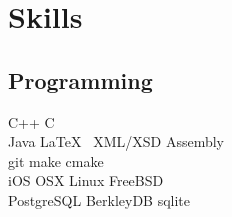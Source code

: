 \documentclass[a4paper]{deedy-resume} %
\begin{document}
\begin{minipage}[t]{0.33\textwidth}

\section{Skills}

\subsection{Programming}

C++ \textbullet{} C \\
Java \LaTeX\ \textbullet{} XML/XSD \textbullet{} Assembly \\
git \textbullet{} make \textbullet{} cmake \\
iOS \textbullet{} OSX \textbullet{} Linux \textbullet{} FreeBSD \\
PostgreSQL \textbullet{} BerkleyDB \textbullet{} sqlite

\sectionspace %


\end{minipage} %
\hfill
%
%
\end{document}
